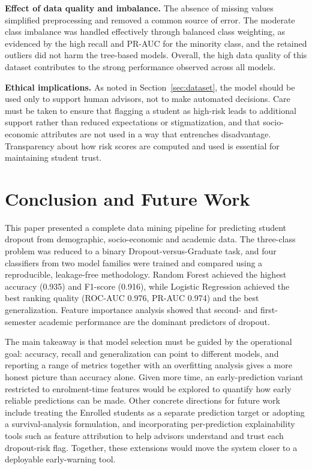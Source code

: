 \documentclass[conference]{IEEEtran}
\begin{document}
	\textbf{Effect of data quality and imbalance.} The absence of missing values simplified preprocessing and removed a common source of error. The moderate class imbalance was handled effectively through balanced class weighting, as evidenced by the high recall and PR-AUC for the minority class, and the retained outliers did not harm the tree-based models. Overall, the high data quality of this dataset contributes to the strong performance observed across all models.
	
	\textbf{Ethical implications.} As noted in Section~\ref{sec:dataset}, the model should be used only to support human advisors, not to make automated decisions. Care must be taken to ensure that flagging a student as high-risk leads to additional support rather than reduced expectations or stigmatization, and that socio-economic attributes are not used in a way that entrenches disadvantage. Transparency about how risk scores are computed and used is essential for maintaining student trust.
	
	\section{Conclusion and Future Work}
	\label{sec:conclusion}
	
	This paper presented a complete data mining pipeline for predicting student dropout from demographic, socio-economic and academic data. The three-class problem was reduced to a binary Dropout-versus-Graduate task, and four classifiers from two model families were trained and compared using a reproducible, leakage-free methodology. Random Forest achieved the highest accuracy (0.935) and F1-score (0.916), while Logistic Regression achieved the best ranking quality (ROC-AUC 0.976, PR-AUC 0.974) and the best generalization. Feature importance analysis showed that second- and first-semester academic performance are the dominant predictors of dropout.
	
	The main takeaway is that model selection must be guided by the operational goal: accuracy, recall and generalization can point to different models, and reporting a range of metrics together with an overfitting analysis gives a more honest picture than accuracy alone. Given more time, an early-prediction variant restricted to enrolment-time features would be explored to quantify how early reliable predictions can be made. Other concrete directions for future work include treating the Enrolled students as a separate prediction target or adopting a survival-analysis formulation, and incorporating per-prediction explainability tools such as feature attribution to help advisors understand and trust each dropout-risk flag. Together, these extensions would move the system closer to a deployable early-warning tool.
	
\end{document}

